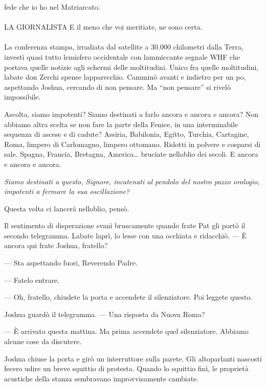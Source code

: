 fede che io ho nel Matriarcato.
\leavevmode\\
\leavevmode\\
LA GIORNALISTA E il meno che voi meritiate, ne sono certa.
\leavevmode\\
\leavevmode\\
La conferenza stampa, irradiata dal satellite a 30.000 chilometri dalla
Terra, investì quasi tutto l\textquotesingle emisfero occidentale con
l\textquotesingle ammiccante segnale WHF che portava quelle notizie agli
schermi delle moltitudini. Unico fra quelle moltitudini,
l\textquotesingle abate don Zerchi spense l\textquotesingle apparecchio.
Camminò avanti e indietro per un po\textquotesingle, aspettando Joshua,
cercando di non pensare. Ma ``non pensare'' si rivelò impossibile.

Ascolta, siamo impotenti? Siamo destinati a farlo ancora e ancora e
ancora? Non abbiamo altra scelta se non fare la parte della Fenice, in
una interminabile sequenza di ascese e di cadute? Assiria, Babilonia,
Egitto, Turchia, Cartagine, Roma, l\textquotesingle impero di
Carlomagno, l\textquotesingle impero ottomano. Ridotti in polvere e
cosparsi di sale. Spagna, Francia, Bretagna, America\ldots{} bruciate
nell\textquotesingle oblio dei secoli. E ancora e ancora e ancora.

\emph{Siamo destinati a questo, Signore, incatenati al pendolo del
	nostro pazzo orologio, impotenti a fermare la sua oscillazione?}

Questa volta ci lancerà nell\textquotesingle oblio, pensò.

Il sentimento di disperazione svanì bruscamente quando frate Pat gli
portò il secondo telegramma. L\textquotesingle abate
l\textquotesingle aprì, lo lesse con una occhiata e ridacchiò. --- È
ancora qui frate Joshua, fratello?

--- Sta aspettando fuori, Reverendo Padre.

--- Fatelo entrare.

--- Oh, fratello, chiudete la porta e accendete il silenziatore. Poi
leggete questo.

Joshua guardò il telegramma. --- Una risposta da Nuova Roma?

--- È arrivato questa mattina. Ma prima accendete quel silenziatore.
Abbiamo alcune cose da discutere.

Joshua chiuse la porta e girò un interruttore sulla parete. Gli
altoparlanti nascosti fecero udire un breve squittio di protesta. Quando
lo squittio finì, le proprietà acustiche della stanza sembravano
improvvisamente cambiate.


